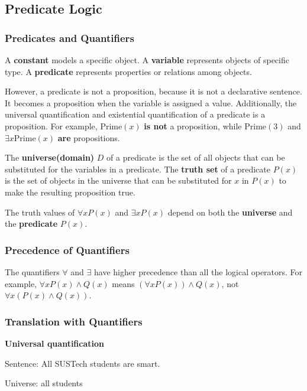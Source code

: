 \documentclass[a4paper,12pt]{article}
\begin{document}
\subsection{Predicate Logic}

\subsubsection{Predicates and Quantifiers}

A \textbf{constant} models a specific object.
A \textbf{variable} represents objects of specific type.
A \textbf{predicate} represents properties or relations among objects.

However, a predicate is not a proposition, because it is not a declarative sentence.
It becomes a proposition when the variable is assigned a value.
Additionally, the universal quantification and existential quantification of a predicate is a proposition.
For example, $\text{Prime}(x)$ \textbf{is not} a proposition, while $\text{Prime}(3)$ and $\exists x \text{Prime}(x)$ \textbf{are} propositions.

The \textbf{universe(domain)} $D$ of a predicate is the set of all objects that can be substituted for the variables in a predicate.
The \textbf{truth set} of a predicate $P(x)$ is the set of objects in the universe that can be substituted for $x$ in $P(x)$ to make the resulting proposition true.

The truth values of $\forall x P(x)$ and $\exists x P(x)$ depend on both the \textbf{universe} and the \textbf{predicate} $P(x)$.

\subsubsection{Precedence of Quantifiers}

The quantifiers $\forall$ and $\exists$ have higher precedence than all the logical operators.
For example, $\forall x P(x) \wedge Q(x)$ means $(\forall x P(x)) \wedge Q(x)$, not $\forall x (P(x) \wedge Q(x))$.

\subsubsection{Translation with Quantifiers}

\textbf{Universal quantification}

\qquad Sentence: All SUSTech students are smart.

\qquad Universe: all students
\end{document}
